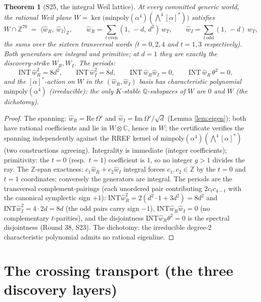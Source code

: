 \documentclass[11pt]{article}
\newtheorem{theorem}{Theorem}[section]
\begin{document}
\begin{theorem}[S25, the integral Weil lattice]\label{thm:s25}
At every committed generic world, the rational Weil plane
$W = \ker\big(\mathrm{minpoly}(\alpha^4)(\bigwedge^4[\alpha]^*)\big)$
satisfies
\[
W \cap \mathbb{Z}^{70} \;=\; \langle \hat w_R,\ \hat w_I\rangle_{\mathbb{Z}},
\qquad
\hat w_R = \sum_{t\ \mathrm{even}} (1,\,-d,\,d^2)\,w_T,\qquad
\hat w_I = \sum_{t\ \mathrm{odd}} (1,\,-d)\,w_T,
\]
the sums over the sixteen transversal words ($t = 0,2,4$ and $t=1,3$
respectively). Both generators are integral and primitive; at $d=1$ they are
exactly the discovery-strike $W_R, W_I$. The periods:
\[
\mathrm{INT}\,\hat w_R^2 = 8d^2,\qquad
\mathrm{INT}\,\hat w_I^2 = 8d,\qquad
\mathrm{INT}\,\hat w_R\hat w_I = 0,\qquad
\mathrm{INT}\,\hat w_R\,\theta^2 = 0,
\]
and the $[\alpha]^*$-action on $W$ in the $(\hat w_R,\hat w_I)$ basis has
characteristic polynomial $\mathrm{minpoly}(\alpha^4)$ (irreducible): the only
$K$-stable $\mathbb{Q}$-subspaces of $W$ are $0$ and $W$ (the dichotomy).
\end{theorem}

\begin{proof}
The spanning: $\hat w_R = \mathrm{Re}\,\Omega'$ and
$\hat w_I = \mathrm{Im}\,\Omega'/\sqrt d$ (Lemma \ref{lem:eigen}); both have
rational coefficients and lie in $W\otimes\mathbb{C}$, hence in $W$; the
certificate verifies the spanning independently against the RREF kernel of
$\mathrm{minpoly}(\alpha^4)(\bigwedge^4[\alpha]^*)$ (two constructions
agreeing). Integrality is immediate (integer coefficients); primitivity: the
$t=0$ (resp.\ $t=1$) coefficient is $1$, so no integer $g>1$ divides the ray.
The $\mathbb{Z}$-span exactness: $c_1\hat w_R + c_2\hat w_I$ integral forces
$c_1,c_2\in\mathbb{Z}$ by the $t=0$ and $t=1$ coordinates; conversely the
generators are integral. The periods are the transversal complement-pairings
(each unordered pair contributing $2c_tc_{4-t}$ with the canonical symplectic
sign $+1$): $\mathrm{INT}\hat w_R^2 = 2(d^2\cdot 1 + 3d^2) = 8d^2$ and
$\mathrm{INT}\hat w_I^2 = 4\cdot 2d = 8d$ (the odd pairs carry sign $-1$),
$\mathrm{INT}\hat w_R\hat w_I = 0$ (no complementary $t$-parities), and the
disjointness $\mathrm{INT}\hat w_R\theta^2 = 0$ is the spectral disjointness
(Round 38, S23). The dichotomy: the irreducible degree-2 characteristic
polynomial admits no rational eigenline.
\end{proof}

\section{The crossing transport (the three discovery layers)}
\end{document}
